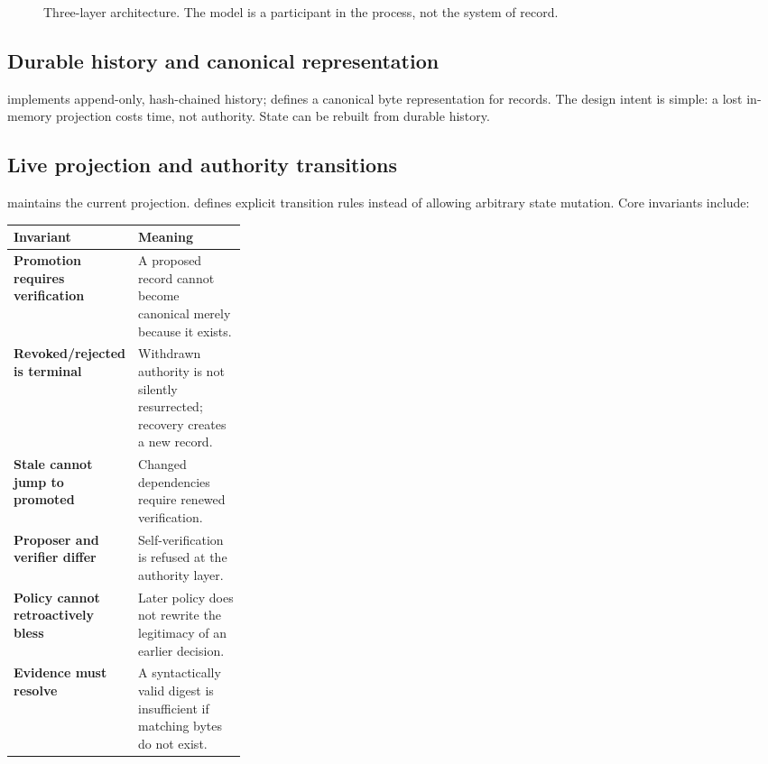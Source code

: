 \begin{figure}[htbp]
\caption{Three-layer architecture. The model is a participant in the process, not the system of record.}
\label{fig:architecture}
\end{figure}

\subsection{Durable history and canonical representation}
 implements append-only, hash-chained history;  defines a canonical byte representation for records. The design intent is simple: a lost in-memory projection costs time, not authority. State can be rebuilt from durable history.

\subsection{Live projection and authority transitions}
 maintains the current projection.  defines explicit transition rules instead of allowing arbitrary state mutation. Core invariants include:

\begin{table}[htbp]
\centering
\small
\begin{tabularx}{\linewidth}{@{}>{\bfseries}p{0.30\linewidth}X@{}}
\toprule
Invariant & Meaning \\
\midrule
Promotion requires verification & A proposed record cannot become canonical merely because it exists.\\
Revoked/rejected is terminal & Withdrawn authority is not silently resurrected; recovery creates a new record.\\
Stale cannot jump to promoted & Changed dependencies require renewed verification.\\
Proposer and verifier differ & Self-verification is refused at the authority layer.\\
Policy cannot retroactively bless & Later policy does not rewrite the legitimacy of an earlier decision.\\
Evidence must resolve & A syntactically valid digest is insufficient if matching bytes do not exist.\\
\bottomrule
\end{tabularx}
\end{table}

